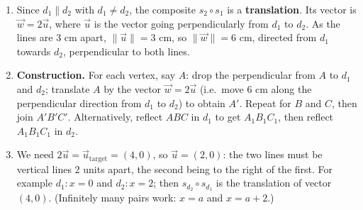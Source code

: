 \documentclass[11pt]{article}
\begin{document}
\begin{corrige}
\begin{enumerate}
\item Since $d_1 \parallel d_2$ with $d_1 \neq d_2$, the composite $s_2 \circ s_1$ is a \textbf{translation}. Its vector is $\vec{w} = 2\vec{u}$, where $\vec{u}$ is the vector going perpendicularly from $d_1$ to $d_2$. As the lines are $3$ cm apart, $\|\vec{u}\| = 3$ cm, so $\|\vec{w}\| = 6$ cm, directed from $d_1$ towards $d_2$, perpendicular to both lines.
\item \textbf{Construction.} For each vertex, say $A$: drop the perpendicular from $A$ to $d_1$ and $d_2$; translate $A$ by the vector $\vec{w} = 2\vec{u}$ (i.e.\ move $6$ cm along the perpendicular direction from $d_1$ to $d_2$) to obtain $A'$. Repeat for $B$ and $C$, then join $A'B'C'$. Alternatively, reflect $ABC$ in $d_1$ to get $A_1B_1C_1$, then reflect $A_1B_1C_1$ in $d_2$.
\item We need $2\vec{u} = \vec{u}_{\text{target}} = (4,0)$, so $\vec{u} = (2,0)$: the two lines must be vertical lines $2$ units apart, the second being to the right of the first. For example $d_1: x = 0$ and $d_2: x = 2$; then $s_{d_2}\circ s_{d_1}$ is the translation of vector $(4,0)$. (Infinitely many pairs work: $x = a$ and $x = a+2$.)
\end{enumerate}
\end{corrige}
\end{document}
